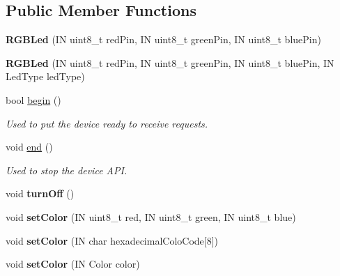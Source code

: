 \subsection*{Public Member Functions}
\begin{DoxyCompactItemize}
\item 
\mbox{\label{class_easyuino_1_1_r_g_b_led_a3580be3110cebddcd06917994ebdb8ad}} 
{\bfseries R\+G\+B\+Led} (IN uint8\+\_\+t red\+Pin, IN uint8\+\_\+t green\+Pin, IN uint8\+\_\+t blue\+Pin)
\item 
\mbox{\label{class_easyuino_1_1_r_g_b_led_a85c5af3b8b5288d7b45eabcf4fc71aba}} 
{\bfseries R\+G\+B\+Led} (IN uint8\+\_\+t red\+Pin, IN uint8\+\_\+t green\+Pin, IN uint8\+\_\+t blue\+Pin, IN Led\+Type led\+Type)
\item 
bool \hyperlink{class_easyuino_1_1_r_g_b_led_abdc3512266c7f584609147fccc1ec816}{begin} ()
\begin{DoxyCompactList}\small\item\em Used to put the device ready to receive requests. \end{DoxyCompactList}\item 
void \hyperlink{class_easyuino_1_1_r_g_b_led_ad0e9fb0da405c537e876c8a2dc22246e}{end} ()
\begin{DoxyCompactList}\small\item\em Used to stop the device A\+PI. \end{DoxyCompactList}\item 
\mbox{\label{class_easyuino_1_1_r_g_b_led_a100140fa6d32e190f68cdc1e24c3aba0}} 
void {\bfseries turn\+Off} ()
\item 
\mbox{\label{class_easyuino_1_1_r_g_b_led_a4c113ab3fbbd2a75f020a902355faa3e}} 
void {\bfseries set\+Color} (IN uint8\+\_\+t red, IN uint8\+\_\+t green, IN uint8\+\_\+t blue)
\item 
\mbox{\label{class_easyuino_1_1_r_g_b_led_a66ad7b78c2ae636c077519950952206c}} 
void {\bfseries set\+Color} (IN char hexadecimal\+Colo\+Code\mbox{[}8\mbox{]})
\item 
\mbox{\label{class_easyuino_1_1_r_g_b_led_a5b8365a4191bbe0a092ba30996a37b13}} 
void {\bfseries set\+Color} (IN Color color)
\end{DoxyCompactItemize}
